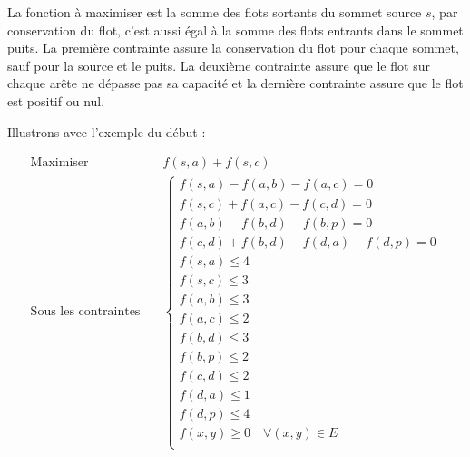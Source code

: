 \documentclass[a4paper]{article}
\begin{document}
La fonction à maximiser est la somme des flots sortants du sommet source $s$, par conservation du flot, c'est aussi égal à la somme des flots entrants dans le sommet puits. La première contrainte assure la conservation du flot pour chaque sommet, sauf pour la source et le puits. La deuxième contrainte assure que le flot sur chaque arête ne dépasse pas sa capacité et la dernière contrainte assure que le flot est positif ou nul.
\begin{eg}
	Illustrons avec l'exemple du début :

	\begin{center}
\end{center}

\[
		\begin{aligned}
			\text{Maximiser} \quad &f(s, a)+f(s, c) \\
			\text{Sous les contraintes} \quad
			&
			 \begin{cases}
				f(s, a) - f(a, b)-f(a,c) = 0 \\
				f(s, c)+f(a,c) - f(c, d) = 0 \\
				f(a, b) - f(b, d) - f(b, p) = 0 \\
				f(c, d) +f(b, d) - f(d, a) - f(d, p) = 0 \\
				f(s, a) \leq 4 \\
				f(s, c) \leq 3 \\
				f(a, b) \leq 3 \\
				f(a, c) \leq 2 \\
				f(b, d) \leq 3 \\
				f(b, p) \leq 2 \\
				f(c, d) \leq 2 \\
				f(d, a) \leq 1 \\
				f(d, p) \leq 4 \\
				f(x, y) \geq 0 \quad \forall (x, y) \in E \\
 			\end{cases}
		\end{aligned}
\]
\end{eg}
\end{document}
